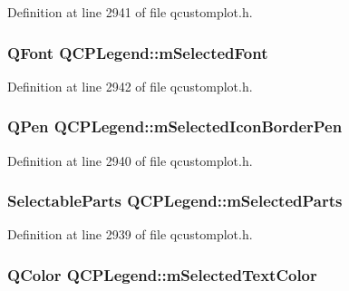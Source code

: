 Definition at line 2941 of file qcustomplot.\-h.

\hypertarget{class_q_c_p_legend_a86ce8f6c20a2f51a48eaf3c24ce16805}{
\subsubsection[{m\-Selected\-Font}]{\setlength{\rightskip}{0pt plus 5cm}Q\-Font Q\-C\-P\-Legend\-::m\-Selected\-Font\hspace{0.3cm}{\ttfamily [protected]}}}\label{class_q_c_p_legend_a86ce8f6c20a2f51a48eaf3c24ce16805}


Definition at line 2942 of file qcustomplot.\-h.

\hypertarget{class_q_c_p_legend_a7429ac0e64c7b90b649b4d8f4cc5fa55}{
\subsubsection[{m\-Selected\-Icon\-Border\-Pen}]{\setlength{\rightskip}{0pt plus 5cm}Q\-Pen Q\-C\-P\-Legend\-::m\-Selected\-Icon\-Border\-Pen\hspace{0.3cm}{\ttfamily [protected]}}}\label{class_q_c_p_legend_a7429ac0e64c7b90b649b4d8f4cc5fa55}


Definition at line 2940 of file qcustomplot.\-h.

\hypertarget{class_q_c_p_legend_a917a34dd2856baafd8d56852d94d00e2}{
\subsubsection[{m\-Selected\-Parts}]{\setlength{\rightskip}{0pt plus 5cm}Selectable\-Parts Q\-C\-P\-Legend\-::m\-Selected\-Parts\hspace{0.3cm}{\ttfamily [protected]}}}\label{class_q_c_p_legend_a917a34dd2856baafd8d56852d94d00e2}


Definition at line 2939 of file qcustomplot.\-h.

\hypertarget{class_q_c_p_legend_a6c25c8796c6e73e983aae6024965f2be}{
\subsubsection[{m\-Selected\-Text\-Color}]{\setlength{\rightskip}{0pt plus 5cm}Q\-Color Q\-C\-P\-Legend\-::m\-Selected\-Text\-Color\hspace{0.3cm}{\ttfamily [protected]}}}\label{class_q_c_p_legend_a6c25c8796c6e73e983aae6024965f2be}


